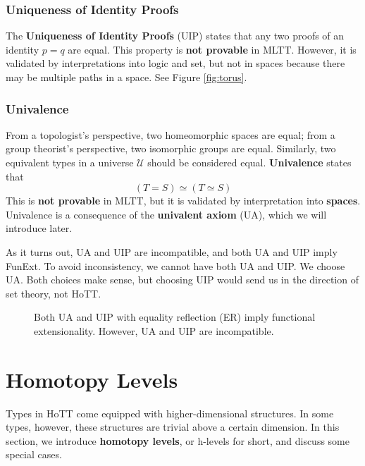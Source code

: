 \documentclass{amsart}
\theoremstyle{definition}
\newcommand{\U}{\ensuremath{\mathcal{U}}}
\renewcommand{\emph}{\textbf}
\begin{document}
\subsubsection{Uniqueness of Identity Proofs}\label{sec:uniqueness-of-identity-proofs}
The \emph{Uniqueness of Identity Proofs} (UIP) states that any two proofs of an identity $p = q$ are equal.
This property is \textbf{not provable} in MLTT.
However, it is validated by interpretations into logic and set, but not in spaces because there may be multiple paths in a space.
See Figure \ref{fig:torus}.

\subsubsection{Univalence}\label{sec:univalence}
From a topologist's perspective, two homeomorphic spaces are equal; from a group theorist's perspective, two isomorphic groups are equal.
Similarly, two equivalent types in a universe $\U$ should be considered equal.
\emph{Univalence} states that
\[
    (T = S) \simeq (T \simeq S)
\]
This is \textbf{not provable} in MLTT, but it is validated by interpretation into \textbf{spaces}.
Univalence is a consequence of the \emph{univalent axiom} (UA), which we will introduce later.

As it turns out, UA and UIP are incompatible, and both UA and UIP imply FunExt.
To avoid inconsistency, we cannot have both UA and UIP. 
We choose UA.
Both choices make sense, but choosing UIP would send us in the direction of set theory, not HoTT.

\begin{figure}[h]
    \centering
    
    \caption{Both UA and UIP with equality reflection (ER) imply functional extensionality.
    However, UA and UIP are incompatible.}
    \label{fig:ua-uip-funext}
\end{figure}

\section{Homotopy Levels}
Types in HoTT come equipped with higher-dimensional structures.
In some types, however, these structures are trivial above a certain dimension.
In this section, we introduce \emph{homotopy levels}, or h-levels for short, and discuss some special cases.
\end{document}
